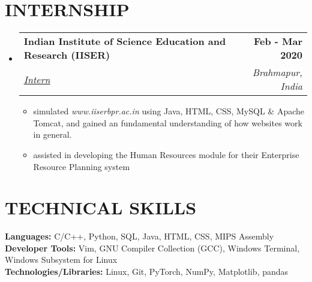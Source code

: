 \documentclass[letterpaper,11pt]{article}
\makeatletter
\newcommand{\resumeItem}[1]{
  \item\small{
    {#1 \vspace{-2pt}}
  }
}
\newcommand{\resumeSubheading}[4]{
  \vspace{-2pt}\item
    \begin{tabular*}{1.0\textwidth}[t]{l@{\extracolsep{\fill}}r}
      \textbf{\large#1} & \textbf{\small #2} \\
      \textit{\large#3} & \textit{\small #4} \\
      
    \end{tabular*}\vspace{-7pt}
}
\newcommand{\resumeSubHeadingListStart}{\begin{itemize}[leftmargin=0.0in, label={}]}
\newcommand{\resumeSubHeadingListEnd}{\end{itemize}}
\newcommand{\resumeItemListStart}{\begin{itemize}}
\newcommand{\resumeItemListEnd}{\end{itemize}\vspace{-5pt}}
\makeatother
\begin{document}
\section{INTERNSHIP}
    \resumeSubHeadingListStart
      \resumeSubheading
        {Indian Institute of Science Education and Research (IISER)}{Feb - Mar 2020}
        {\href{https://drive.google.com/file/d/1MjAsp7TuGCDzTJeRRi4D6GTi0dCwG9xk/view?usp=sharing}{\underline{Intern}} {\raisebox{-0.1\height}\faExternalLink}}{Brahmapur, India}
        \resumeItemListStart
          \resumeItem{\normalsize{simulated \textit{www.iiserbpr.ac.in} using Java, HTML, CSS, MySQL \& Apache Tomcat, and gained an fundamental understanding of how websites work in general.}}
          \resumeItem{\normalsize{assisted in developing the Human Resources module for their Enterprise Resource Planning system}}
        \resumeItemListEnd
    \resumeSubHeadingListEnd
\vspace{-12pt}


\section{TECHNICAL SKILLS}
\begin{itemize}[leftmargin=0.15in, label={}]
	\small{\item{
		\textbf{\normalsize{Languages:}}{ \normalsize{C/C++, Python, SQL, Java, HTML, CSS, MIPS Assembly}} \\
		\textbf{\normalsize{Developer Tools:}}{ \normalsize{Vim, GNU Compiler Collection (GCC), Windows Terminal, Windows Subsystem for Linux}} \\
		\textbf{\normalsize{Technologies/Libraries:}}{\normalsize{ Linux, Git, PyTorch, NumPy, Matplotlib, pandas}} \\
	}}
\end{itemize}
\vspace{-12pt}

 
\end{document}
